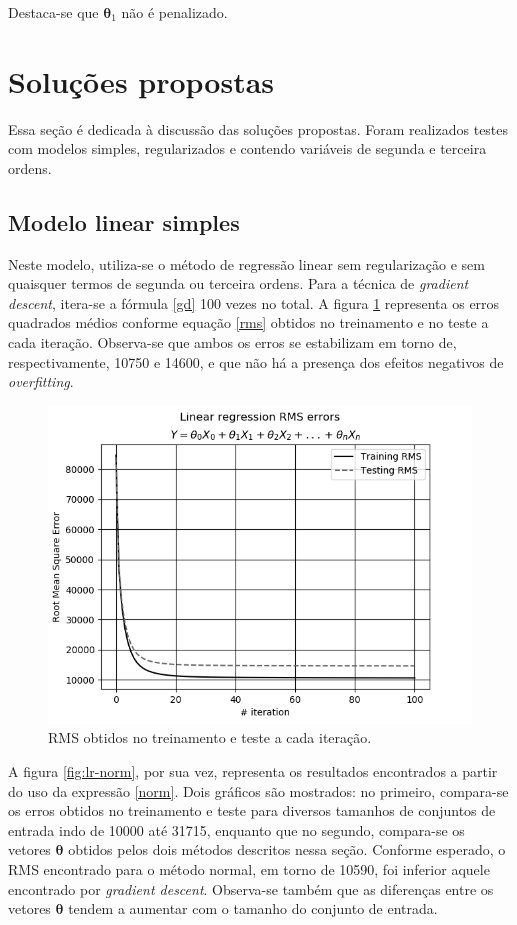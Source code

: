 \documentclass[10pt,twocolumn,letterpaper]{article}
\begin{document}
Destaca-se que \(\bm{\theta}_1\) não é penalizado.

\section{Soluções propostas}

Essa seção é dedicada à discussão das soluções propostas. Foram realizados testes com modelos simples, regularizados e contendo variáveis de segunda e terceira ordens.

\subsection {Modelo linear simples}

Neste modelo, utiliza-se o método de regressão linear sem regularização e sem quaisquer termos de segunda ou terceira ordens. Para a técnica de \textit{gradient descent}, itera-se a fórmula \ref{gd} 100 vezes no total. A figura \ref{fig:lr-gd} representa os erros quadrados médios conforme equação \ref{rms} obtidos no treinamento e no teste a cada iteração. Observa-se que ambos os erros se estabilizam em torno de, respectivamente, 10750 e 14600, e que não há a presença dos efeitos negativos de \textit {overfitting}.

\begin{figure}
    \centering
    \includegraphics[width=0.9\columnwidth]{img/lr-gd.png}
    \caption{RMS obtidos no treinamento e teste a cada iteração.}
    \label{fig:lr-gd}
\end{figure}

A figura \ref{fig:lr-norm}, por sua vez, representa os resultados encontrados a partir do uso da expressão \ref{norm}. Dois gráficos são mostrados: no primeiro, compara-se os erros obtidos no treinamento e teste para diversos tamanhos de conjuntos de entrada indo de 10000 até 31715, enquanto que no segundo, compara-se os vetores \(\bm{\theta}\) obtidos pelos dois métodos descritos nessa seção. Conforme esperado, o RMS encontrado para o método normal, em torno de 10590, foi inferior aquele encontrado por \textit{gradient descent}. Observa-se também que as diferenças entre os vetores \(\bm{\theta}\) tendem a aumentar com o tamanho do conjunto de entrada.
\end{document}
